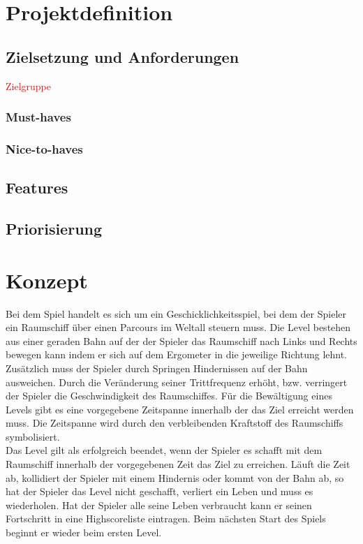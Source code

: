 

\chapter{Projektdefinition}
\section{Zielsetzung und Anforderungen}
\textcolor{red}{Zielgruppe}
\subsection{Must-haves}
\subsection{Nice-to-haves}
\section{Features}
\section{Priorisierung}

\chapter{Konzept}
Bei dem Spiel handelt es sich um ein Geschicklichkeitsspiel, bei dem der Spieler ein Raumschiff über einen Parcours im Weltall steuern muss. Die Level bestehen aus einer geraden Bahn auf der der Spieler das Raumschiff nach Links und Rechts bewegen kann indem er sich auf dem Ergometer in die jeweilige Richtung lehnt. Zusätzlich muss der Spieler durch Springen Hindernissen auf der Bahn ausweichen. Durch die Veränderung seiner Trittfrequenz erhöht, bzw. verringert der Spieler die Geschwindigkeit des Raumschiffes. Für die Bewältigung eines Levels gibt es eine vorgegebene Zeitspanne innerhalb der das Ziel erreicht werden muss. Die Zeitspanne wird durch den verbleibenden Kraftstoff des Raumschiffs symbolisiert.\\
Das Level gilt als erfolgreich beendet, wenn der Spieler es schafft mit dem Raumschiff innerhalb der vorgegebenen Zeit das Ziel zu erreichen. Läuft die Zeit ab, kollidiert der Spieler mit einem Hindernis oder kommt von der Bahn ab, so hat der Spieler das Level nicht geschafft, verliert ein Leben und muss es wiederholen. Hat der Spieler alle seine Leben verbraucht kann er seinen Fortschritt in eine Highscoreliste eintragen. Beim nächsten Start des Spiels beginnt er wieder beim ersten Level.

